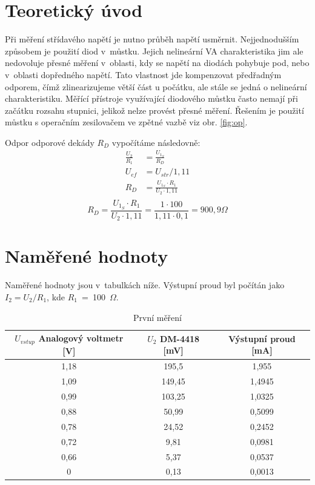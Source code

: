 \documentclass[a4paper,12pt]{article}   %
\newcommand{\tohm}{$\Omega$}
\begin{document}
\section{Teoretický úvod}
Při měření střídavého napětí je nutno průběh napětí usměrnit. Nejjednodušším způsobem je použití diod v~můstku. Jejich nelineární VA charakteristika jim ale nedovoluje přesné měření v~oblasti, kdy se napětí na diodách pohybuje pod, nebo v~oblasti dopředného napětí. Tato vlastnost jde kompenzovat předřadným odporem, čímž zlinearizujeme větší část u počátku, ale stále se jedná o nelineární charakteristiku. Měřící přístroje využívající diodového můstku často nemají při začátku rozsahu stupnici, jelikož nelze provést přesné měření. Řešením je použití můstku s operačním zesilovačem ve zpětné vazbě viz obr. \ref{fig:op}.

Odpor odporové dekády $R_D$ vypočítáme následovně: 
\begin{equation*}
    \begin{split}
        \frac{U_2}{R_1} &= \frac{U_{1_S}}{R_D} \\
        U_{ef} &= U_{str}/1,11\\
        R_D &= \frac{U_{1_S}\cdot R_1}{U_2\cdot 1,11}\\
    \end{split}
\end{equation*}
\begin{equation*}
    R_D= \frac{U_{1_S}\cdot R_1}{U_2\cdot 1,11} = \frac{1\cdot 100}{1,11\cdot 0,1} = 900,9 \Omega
\end{equation*}


\section{Naměřené hodnoty}
Naměřené hodnoty jsou v~tabulkách níže. Výstupní proud byl počítán jako $I_2=U_2/R_1$, kde $R_1$~=~100~\tohm.

\begin{table}[h!]
    \centering
    \begin{tabular}{|c|c|c|}
        \hline
        $U_{vstup}$ Analogový voltmetr [V] &$U_{2}$ DM-4418 [mV] &Výstupní proud [mA] \\\hline\hline
        1,18    &195,5  &1,955  \\\hline
        1,09    &149,45 &1,4945 \\\hline
        0,99    &103,25 &1,0325 \\\hline
        0,88    &50,99  &0,5099 \\\hline
        0,78    &24,52  &0,2452 \\\hline
        0,72    &9,81   &0,0981 \\\hline
        0,66    &5,37   &0,0537 \\\hline
        0       &0,13   &0,0013 \\\hline
    \end{tabular}
    \caption{První měření}
\end{table}
\end{document}

